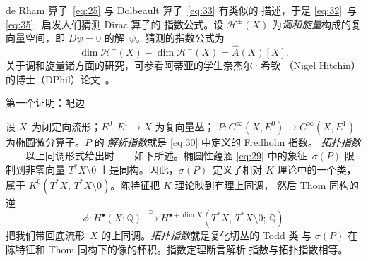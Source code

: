 \documentclass[11pt]{amsart}
\makeatletter
\def\subsection{\@startsection{subsection}{2}%
   \z@{1.25\linespacing\@plus.7\linespacing}{.5\linespacing}%
   {\normalfont\bfseries}}
\theoremstyle{definition}
\theoremstyle{remark}
\theoremstyle{plain}
\numberwithin{equation}{section}
\renewcommand{\:}{\colon}
\newcommand{\Ahat}{{\hat A}}
\newcommand{\CC}{{\mathbb C}}
\newcommand{\QQ}{{\mathbb Q}}
\DeclareMathOperator{\ch}{ch}
\DeclareMathOperator{\coker}{coker}
\DeclareMathOperator{\ind}{ind}
\DeclareMathOperator{\Todd}{Todd}
\newcommand{\sH}{\mathscr{H}}
\renewcommand{\SS}{\mathbb{S}}
\makeatother
\begin{document}

de Rham 算子~\eqref{eq:25} 与 Dolbeault 算子~\eqref{eq:33} 有类似的
描述，于是 \eqref{eq:32}~与 \eqref{eq:35} ~启发人们猜测 Dirac 算子的
指数公式。设 $\sH^{\pm}(X)$ 为\emph{调和旋量}构成的复向量空间，即
$D\psi =0$ 的解~$\psi $。猜测的指数公式为
  \begin{equation}\label{eq:42}
     \dim\sH^+(X) - \dim\sH^-(X) = \Ahat(X)[X]. 
  \end{equation}
关于调和旋量诸方面的研究，可参看阿蒂亚的学生奈杰尔·希钦
（Nigel Hitchin）的博士（DPhil）论文~\cite{Hi}。

  \subsection{第一个证明：配边}\label{subsec:4.2}


设 $X$~为闭定向流形；$E^0,E^1\to X$ 为复向量丛；
$P\:C^{\infty}(X,E^0)\to C^{\infty}(X,E^1)$ 为椭圆微分算子。$P$ 的
\emph{解析指数}就是 \eqref{eq:30} 中定义的 Fredholm 指数。
\emph{拓扑指数}——以上同调形式给出时——如下所述。椭圆性蕴涵
\eqref{eq:29} 中的象征~$\sigma (P)$ 限制到非零向量 $T^*X\setminus 0$
上是同构。因此，$\sigma (P)$~定义了相对 $K$ 理论中的一个类，属于
$K^0(T^*X,\,T^*X\setminus 0)$。陈特征把 $K$ 理论映到有理上同调，
然后 Thom 同构的逆
  \begin{equation}\label{eq:43}
     \phi \:H^{\bullet }(X;\QQ)\xrightarrow{\;\;\cong \;\;} H^{\bullet +\dim
     X}(T^*X,\,T^*X\setminus 0;\,\QQ) 
  \end{equation}
把我们带回底流形~$X$ 的上同调。\emph{拓扑指数}就是复化切丛的 Todd 类
与 $\sigma (P)$ 在陈特征和 Thom 同构下的像的杯积。指数定理断言解析
指数与拓扑指数相等。
\end{document}
